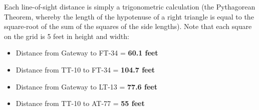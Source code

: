 Each line-of-sight distance is simply a trigonometric calculation (the Pythagorean Theorem, whereby the length of the hypotenuse of a right triangle is equal to the square-root of the sum of the squares of the side lengths).  Note that each square on the grid is 5 feet in height and width:

\begin{itemize}
\item{} Distance from Gateway to FT-34 = {\bf 60.1 feet} 
\item{} Distance from TT-10 to FT-34 = {\bf 104.7 feet} 
\item{} Distance from Gateway to LT-13 = {\bf 77.6 feet} 
\item{} Distance from TT-10 to AT-77 = {\bf 55 feet}
\end{itemize}




